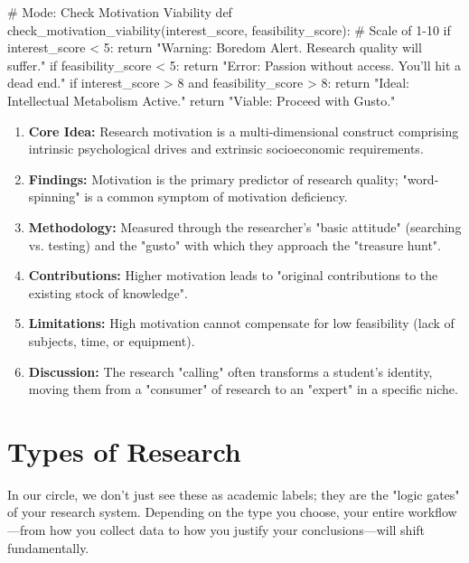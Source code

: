\documentclass{report}
\begin{document}
\begin{}[python3]
    #  Mode: Check Motivation Viability
    def check_motivation_viability(interest_score, feasibility_score):
        # Scale of 1-10
        if interest_score < 5:
            return "Warning: Boredom Alert. Research quality will suffer."
    if feasibility_score < 5:
        return "Error: Passion without access. You'll hit a dead end."
    if interest_score > 8 and feasibility_score > 8:
        return "Ideal: Intellectual Metabolism Active."
    return "Viable: Proceed with Gusto."
\end{}

\begin{paper}
    \begin{enumerate}
        \item \textbf{Core Idea:} Research motivation is a multi-dimensional construct comprising intrinsic psychological drives and extrinsic socioeconomic requirements.
        \item \textbf{Findings:} Motivation is the primary predictor of research quality; "word-spinning" is a common symptom of motivation deficiency.
        \item \textbf{Methodology:} Measured through the researcher's "basic attitude" (searching vs. testing) and the "gusto" with which they approach the "treasure hunt".
        \item \textbf{Contributions:} Higher motivation leads to "original contributions to the existing stock of knowledge".
        \item \textbf{Limitations:} High motivation cannot compensate for low feasibility (lack of subjects, time, or equipment).
        \item \textbf{Discussion:} The research "calling" often transforms a student's identity, moving them from a "consumer" of research to an "expert" in a specific niche.
    \end{enumerate}
\end{paper}

\section{Types of Research}

In our circle, we don't just see these as academic labels; they are the "logic gates" of your research system. Depending on the type you choose, your entire workflow—from how you collect data to how you justify your conclusions—will shift fundamentally.
\end{document}
